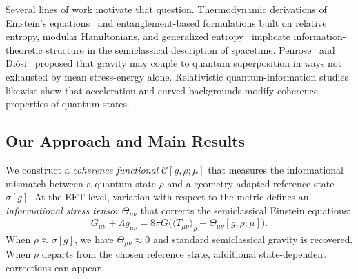 \documentclass[aps,prd,twocolumn,superscriptaddress,nofootinbib,floatfix]{revtex4-2}
\newcommand{\Cfunc}{\mathcal{C}}
\newcommand{\Tmn}{\Theta_{\mu\nu}}
\begin{document}
Several lines of work motivate that question. Thermodynamic derivations of Einstein's equations~\cite{Jacobson1995} and entanglement-based formulations built on relative entropy, modular Hamiltonians, and generalized entropy~\cite{Casini2008,Casini2011,FaulknerLewkowyczMaldacena2013} implicate information-theoretic structure in the semiclassical description of spacetime. Penrose~\cite{Penrose1996} and Di\'{o}si~\cite{Diosi1989} proposed that gravity may couple to quantum superposition in ways not exhausted by mean stress-energy alone. Relativistic quantum-information studies likewise show that acceleration and curved backgrounds modify coherence properties of quantum states.

\subsection{Our Approach and Main Results}

We construct a \emph{coherence functional} $\Cfunc[g,\rho;\mu]$ that measures the informational mismatch between a quantum state $\rho$ and a geometry-adapted reference state $\sigma[g]$. At the EFT level, variation with respect to the metric defines an \emph{informational stress tensor} $\Tmn$ that corrects the semiclassical Einstein equations:
\begin{equation}
    G_{\mu\nu} + \Lambda g_{\mu\nu}
    = 8\pi G\big(\langle T_{\mu\nu} \rangle_{\rho}
    + \Tmn[g,\rho;\mu]\big).
    \label{eq:intro-einstein}
\end{equation}
When $\rho \approx \sigma[g]$, we have $\Tmn \approx 0$ and standard semiclassical gravity is recovered. When $\rho$ departs from the chosen reference state, additional state-dependent corrections can appear.
\end{document}
